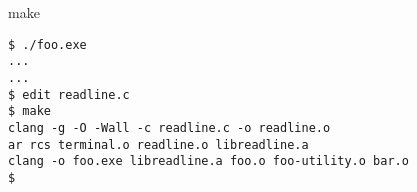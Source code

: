 \begin{frame}[fragile]{make}
\begin{Verbatim}
$ ./foo.exe
...
...
$ edit readline.c
$ make
clang -g -O -Wall -c readline.c -o readline.o
ar rcs terminal.o readline.o libreadline.a
clang -o foo.exe libreadline.a foo.o foo-utility.o bar.o
$ 
\end{Verbatim}
\end{frame}
